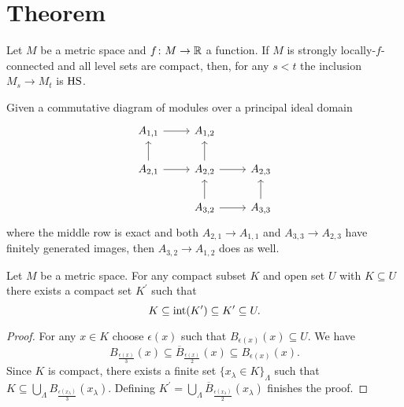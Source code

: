 \section{Theorem} \label{sec:theorem}

\begin{thm} \label{t:strong local connectenss implies q-tameness}
	Let $M$ be a metric space and $f \colon M \to \mathbb{R}$ a function. If $M$ is strongly locally-$f$-connected and all level sets are compact, then, for any $s < t$ the inclusion $M_s \to M_t$ is $\mathrm{HS}$.
\end{thm}

\begin{lem} \label{l:commutative algebra}
	Given a commutative diagram of modules over a principal ideal domain
	\begin{equation*}
	\begin{tikzcd}
	A_{1,1} \arrow[r] & A_{1,2} & \\
	A_{2,1} \arrow[r] \arrow[u] & A_{2,2} \arrow[r] \arrow[u] & A_{2,3} \\
	& A_{3,2} \arrow[r] \arrow[u] & A_{3,3} \arrow[u]
	\end{tikzcd}
	\end{equation*}
	where the middle row is exact and both $A_{2,1} \to A_{1,1}$ and $A_{3,3} \to A_{2,3}$ have finitely generated images, then $A_{3,2} \to A_{1,2}$ does as well.
\end{lem}

\begin{lem} \label{l:neighborhood third}
	Let $M$ be a metric space. For any compact subset $K$ and open set $U$ with $K \subseteq U$ there exists a compact set $K^\prime$ such that
	\begin{equation*}
	K \subseteq \operatorname{int}(K^\prime) \subseteq K^\prime \subseteq U.
	\end{equation*}
\end{lem}

\begin{proof}
	For any $x \in K$ choose $\epsilon(x)$ such that $B_{\epsilon(x)}(x) \subseteq U$. We have
	\begin{equation*}
	B_{\frac{\epsilon(x)}{3}}(x) \subseteq \overline B_{\frac{\epsilon(x)}{2}}(x) \subseteq B_{\epsilon(x)}(x).
	\end{equation*}
	Since $K$ is compact, there exists a finite set $\{x_\lambda \in K\}_{\Lambda}$ such that $K \subseteq \bigcup_{\Lambda} B_{\frac{\epsilon(x_\lambda)}{3}}(x_\lambda)$. Defining $K^\prime = \bigcup_{\Lambda} \overline B_{\frac{\epsilon(x_\lambda)}{2}}(x_\lambda)$ finishes the proof.
\end{proof}

